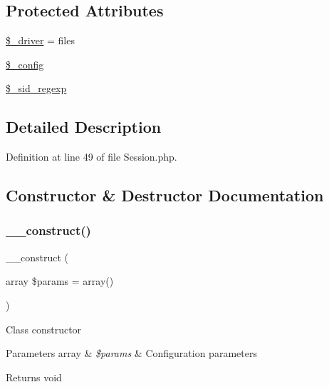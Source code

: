 \subsection*{Protected Attributes}
\begin{DoxyCompactItemize}
\item 
\mbox{\hyperlink{class_c_i___session_a538d24348271772aa61f8239cc6431dd}{\$\+\_\+driver}} = \textquotesingle{}files\textquotesingle{}
\item 
\mbox{\hyperlink{class_c_i___session_a4d4ad4af1600438042f93a4492f8dbbe}{\$\+\_\+config}}
\item 
\mbox{\hyperlink{class_c_i___session_a4e2477585e746eb415b2b69bb237be72}{\$\+\_\+sid\+\_\+regexp}}
\end{DoxyCompactItemize}


\subsection{Detailed Description}


Definition at line 49 of file Session.\+php.



\subsection{Constructor \& Destructor Documentation}
\mbox{\label{class_c_i___session_a85ac5b7f54ad67ec6b5b9dc282717602}} 
\subsubsection{\texorpdfstring{\_\_construct()}{\_\_construct()}}
{\footnotesize\ttfamily \+\_\+\+\_\+construct (\begin{DoxyParamCaption}\item[{array}]{\$params = {\ttfamily array()} }\end{DoxyParamCaption})}

Class constructor


\begin{DoxyParams}[1]{Parameters}
array & {\em \$params} & Configuration parameters \\
\hline
\end{DoxyParams}
\begin{DoxyReturn}{Returns}
void 
\end{DoxyReturn}


